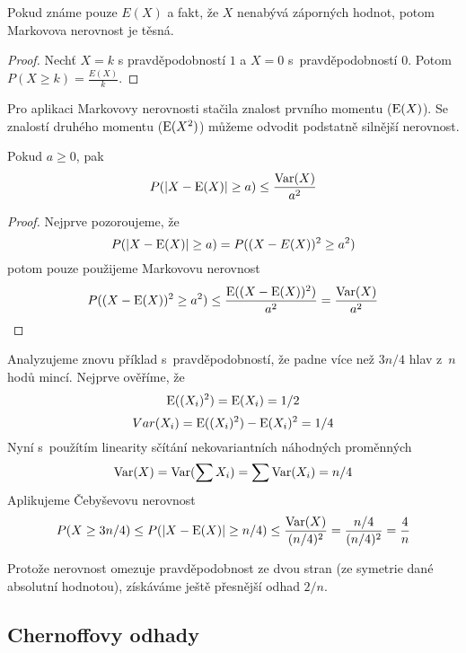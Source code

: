 \begin{theorem}
    Pokud známe pouze $E(X)$ a fakt, že $X$ nenabývá záporných hodnot,
    potom Markovova nerovnost je těsná.
\end{theorem}

\begin{proof}
    Nechť $X = k$ s pravděpodobností $1$
    a $X = 0$ s~pravděpodobností $0$.
    Potom $P(X \geq k) = \frac{E(X)}{k}$.
\end{proof}

Pro aplikaci Markovovy nerovnosti stačila znalost prvního momentu
($\operatorname{E}(X)$). Se znalostí druhého momentu ($\operatorname{E}(X^2)$) můžeme
odvodit podstatně silnější nerovnost.

\begin{theorem}
    Pokud $a \geq 0$, pak
    \[
        P(\lvert X - \operatorname{E}(X) \rvert \geq a) \leq \frac{\operatorname{Var}(X)}{a^2}
    \]
\end{theorem}

\begin{proof}
    Nejprve pozoroujeme, že
    \[
        P(\lvert X - \operatorname{E}(X) \rvert \geq a)
        = P((X - E(X))^2 \geq a^2)
\]
    potom pouze použijeme Markovovu nerovnost
    \[
        P((X - \operatorname{E}(X))^2 \geq a^2)
        \leq \frac{\operatorname{E}((X - \operatorname{E}(X))^2)}{a^2}
        = \frac{\operatorname{Var}(X)}{a^2}
        \qedhere
    \]
\end{proof}

\begin{example}
    Analyzujeme znovu příklad s~pravděpodobností, že padne více než
    $3n/4$ hlav z~$n$ hodů mincí. Nejprve ověříme, že
    \[
        \operatorname{E}((X_i)^2) = \operatorname{E}(X_i) = 1/2
    \]\[
        Var(X_i) = \operatorname{E}((X_i)^2) - \operatorname{E}(X_i)^2 = 1/4
    \]
    Nyní s~použítím linearity sčítání nekovariantních náhodných
    proměnných
    \[
        \operatorname{Var}(X) = \operatorname{Var}(\sum X_i) = \sum \operatorname{Var}(X_i) = n/4
    \]
    Aplikujeme Čebyševovu nerovnost
    \[
        P(X \geq 3n/4 ) \leq P(\lvert X - \operatorname{E}(X) \rvert \geq n/4)
                     \leq \frac{\operatorname{Var}(X)}{(n/4)^2}
                     = \frac{n/4}{(n/4)^2}
                    = \frac{4}{n}
    \]

    Protože nerovnost omezuje pravděpodobnost ze dvou stran (ze symetrie
    dané absolutní hodnotou), získáváme ještě přesnější odhad $2/n$.
\end{example}

\subsection{Chernoffovy odhady}

